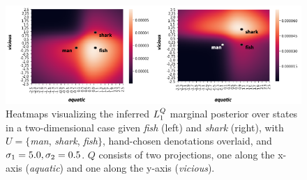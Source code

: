 \documentclass[9pt,twocolumn,twoside,lineno]{pnas-new}
\newcommand{\Listener}{L}
\newcommand{\QLONE}{\Listener_{{1}}^{{Q}}}
\begin{document}
	\begin{figure}

	\centering

	\includegraphics[width=\textwidth]{images/bothheatmaps.png}








	\caption{Heatmaps visualizing the inferred $\protect\QLONE$ marginal posterior over states in a two-dimensional case given \emph{fish} (left) and \emph{shark} (right), with $U = \{$\emph{man}, \emph{shark}, \emph{fish}$\}$, hand-chosen denotations overlaid, and $\protect\sigma\protect_1=5.0, \protect\sigma\protect_2=0.5$. $Q$ consists of two projections, one along the x-axis (\emph{aquatic}) and one along the y-axis (\emph{vicious}).}


	\label{l1heatmaps}

	\end{figure}
 





\end{document}
